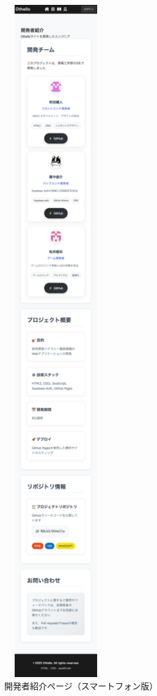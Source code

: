 \documentclass[10pt, a4paper]{jsarticle}
\begin{document}
\begin{figure}[H]
\centering
\includegraphics[width=0.4\textwidth]{img/developer-phone.png}
\caption{開発者紹介ページ（スマートフォン版）}
\label{fig:developer-phone}
\end{figure}
\end{document}
